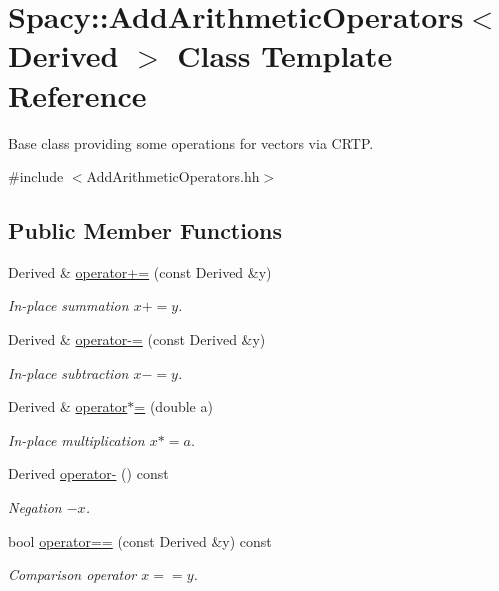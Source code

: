 \hypertarget{classSpacy_1_1AddArithmeticOperators}{\section{\-Spacy\-:\-:\-Add\-Arithmetic\-Operators$<$ \-Derived $>$ \-Class \-Template \-Reference}
\label{classSpacy_1_1AddArithmeticOperators}
}


\-Base class providing some operations for vectors via \-C\-R\-T\-P.  




{\ttfamily \#include $<$\-Add\-Arithmetic\-Operators.\-hh$>$}

\subsection*{\-Public \-Member \-Functions}
\begin{DoxyCompactItemize}
\item 
\-Derived \& \hyperlink{classSpacy_1_1AddArithmeticOperators_afad1d01e1e8c6f75290ac46d9b047ea8}{operator+=} (const \-Derived \&y)
\begin{DoxyCompactList}\small\item\em \-In-\/place summation $ x+=y$. \end{DoxyCompactList}\item 
\-Derived \& \hyperlink{classSpacy_1_1AddArithmeticOperators_a9fa91e177d13203cfe8cfa991c64ca36}{operator-\/=} (const \-Derived \&y)
\begin{DoxyCompactList}\small\item\em \-In-\/place subtraction $ x-=y$. \end{DoxyCompactList}\item 
\-Derived \& \hyperlink{classSpacy_1_1AddArithmeticOperators_a1d3db95b24fd2bc1de712c9e04c47e2f}{operator$\ast$=} (double a)
\begin{DoxyCompactList}\small\item\em \-In-\/place multiplication $ x*=a$. \end{DoxyCompactList}\item 
\-Derived \hyperlink{classSpacy_1_1AddArithmeticOperators_a5acd030bf265d130983fd6e3c5b68be5}{operator-\/} () const 
\begin{DoxyCompactList}\small\item\em \-Negation $ -x$. \end{DoxyCompactList}\item 
bool \hyperlink{classSpacy_1_1AddArithmeticOperators_a5ff1909f49f4a705d69663dc2d4b6316}{operator==} (const \-Derived \&y) const 
\begin{DoxyCompactList}\small\item\em \-Comparison operator $ x==y$. \end{DoxyCompactList}\end{DoxyCompactItemize}


